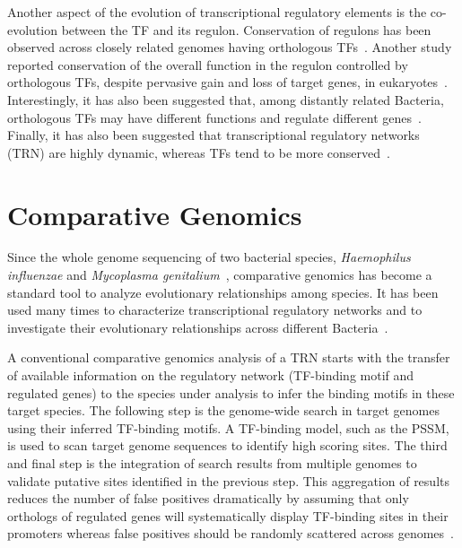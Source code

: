 Another aspect of the evolution of transcriptional regulatory elements is the
co-evolution between the TF and its regulon. Conservation of regulons has been
observed across closely related genomes having orthologous
TFs~\cite{mironov1999computer, tan2001comparative}. Another study reported
conservation of the overall function in the regulon controlled by orthologous
TFs, despite pervasive gain and loss of target genes, in
eukaryotes~\cite{habib2012functional}. Interestingly, it has also been
suggested that, among distantly related Bacteria, orthologous TFs may have
different functions and regulate different
genes~\cite{price2007orthologous}. Finally, it has also been suggested that
transcriptional regulatory networks (TRN) are highly dynamic, whereas TFs tend to
be more conserved~\cite{babu2006evolutionary, chavez2006bacterial}.

\section{Comparative Genomics}

Since the whole genome sequencing of two bacterial species, \textit{Haemophilus
  influenzae} and \textit{Mycoplasma genitalium}~\cite{fleischmann1995whole,
  fraser1995minimal}, comparative genomics has become a standard tool to
analyze evolutionary relationships among species. It has been used many times
to characterize transcriptional regulatory networks and to investigate their
evolutionary relationships across different
Bacteria~\cite{gelfand2000prediction, ravcheev2013genomic,
  meireles2009comparative, kellis2004methods, erill2004differences,
  erill2007aeons, sanchez2012analysis, cornish2012inference}.

A conventional comparative genomics analysis of a TRN starts with the transfer
of available information on the regulatory network (TF-binding motif and
regulated genes) to the species under analysis to infer the binding motifs in
these target species. The following step is the genome-wide search in target
genomes using their inferred TF-binding motifs. A TF-binding model, such as the
PSSM, is used to scan target genome sequences to identify high scoring sites. The
third and final step is the integration of search results from multiple genomes
to validate putative sites identified in the previous step. This aggregation of
results reduces the number of false positives dramatically by assuming that
only orthologs of regulated genes will systematically display TF-binding sites
in their promoters whereas false positives should be randomly scattered across
genomes~\cite{rodionov2007comparative}.


